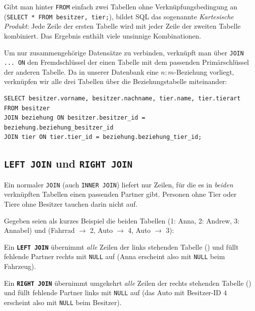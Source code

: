 Gibt man hinter \lstinline|FROM| einfach zwei Tabellen ohne Verknüpfungsbedingung
an (\lstinline|SELECT * FROM besitzer, tier;|), bildet SQL das sogenannte
\emph{Kartesische Produkt}: Jede Zeile der ersten Tabelle wird mit jeder Zeile
der zweiten Tabelle kombiniert. Das Ergebnis enthält viele unsinnige
Kombinationen.

Um nur zusammengehörige Datensätze zu verbinden, verknüpft man über
\lstinline|JOIN ... ON| den Fremdschlüssel der einen Tabelle mit dem passenden
Primärschlüssel der anderen Tabelle. Da in unserer Datenbank eine
$n:m$-Beziehung vorliegt, verknüpfen wir alle drei Tabellen über die
Beziehungstabelle miteinander:

\begin{lstlisting}
SELECT besitzer.vorname, besitzer.nachname, tier.name, tier.tierart
FROM besitzer
JOIN beziehung ON besitzer.besitzer_id = beziehung.beziehung_besitzer_id
JOIN tier ON tier.tier_id = beziehung.beziehung_tier_id;
\end{lstlisting}

\subsection{\texttt{LEFT JOIN} und \texttt{RIGHT JOIN}}

Ein normaler \lstinline|JOIN| (auch \lstinline|INNER JOIN|) liefert nur Zeilen,
für die es in \emph{beiden} verknüpften Tabellen einen passenden Partner gibt.
Personen ohne Tier oder Tiere ohne Besitzer tauchen darin nicht auf.

Gegeben seien als kurzes Beispiel die beiden Tabellen 
(1: Anna, 2: Andrew, 3: Annabel) und  (Fahrrad $\rightarrow$ 2,
Auto $\rightarrow$ 4, Auto $\rightarrow$ 3):

\begin{compactitem}
  \item Ein \textbf{\lstinline|LEFT JOIN|} übernimmt \emph{alle} Zeilen der
  links stehenden Tabelle () und füllt fehlende Partner
  rechts mit \lstinline|NULL| auf (Anna erscheint also mit \lstinline|NULL| beim
  Fahrzeug).
  \item Ein \textbf{\lstinline|RIGHT JOIN|} übernimmt umgekehrt \emph{alle}
  Zeilen der rechts stehenden Tabelle () und füllt
  fehlende Partner links mit \lstinline|NULL| auf (das Auto mit Besitzer-ID $4$
  erscheint also mit \lstinline|NULL| beim Besitzer).
\end{compactitem}

